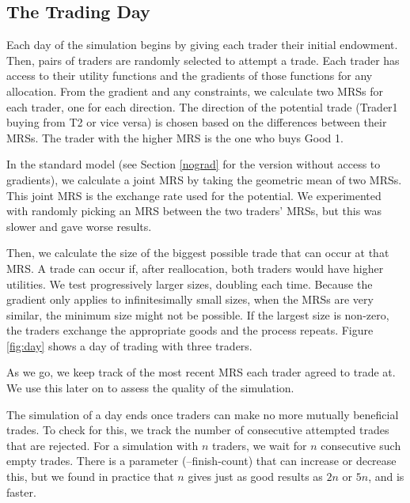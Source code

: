\documentclass[12pt,a4paper,titlepage]{article}
\begin{document}
\subsection{The Trading Day}

Each day of the simulation begins by giving each trader their initial endowment.
Then, pairs of traders are randomly selected to attempt a trade.
Each trader has access to their utility functions and the gradients of those functions for any allocation.
From the gradient and any constraints, we calculate two MRSs for each trader, one for each direction.
The direction of the potential trade (Trader1 buying from T2 or vice versa) is chosen based on the differences between their MRSs.
The trader with the higher MRS is the one who buys Good 1.

In the standard model (see Section \ref{nograd} for the version without access to gradients), we calculate a joint MRS by taking the geometric mean of two MRSs.
This joint MRS is the exchange rate used for the potential.
We experimented with randomly picking an MRS between the two traders' MRSs, but this was slower and gave worse results.


Then, we calculate the size of the biggest possible trade that can occur at that MRS.
A trade can occur if, after reallocation, both traders would have higher utilities.
We test progressively larger sizes, doubling each time.
Because the gradient only applies to infinitesimally small sizes, when the MRSs are very similar, the minimum size might not be possible.
If the largest size is non-zero, the traders exchange the appropriate goods and the process repeats.
Figure \ref{fig:day} shows a day of trading with three traders.

As we go, we keep track of the most recent MRS each trader agreed to trade at.
We use this later on to assess the quality of the simulation.

The simulation of a day ends once traders can make no more mutually beneficial trades.
To check for this, we track the number of consecutive attempted trades that are rejected. 
For a simulation with $n$ traders, we wait for $n$ consecutive such empty trades.
There is a parameter (--finish-count) that can increase or decrease this, but we found in practice that $n$ gives just as good results as $2n$ or $5n$, and is faster.
\end{document}
